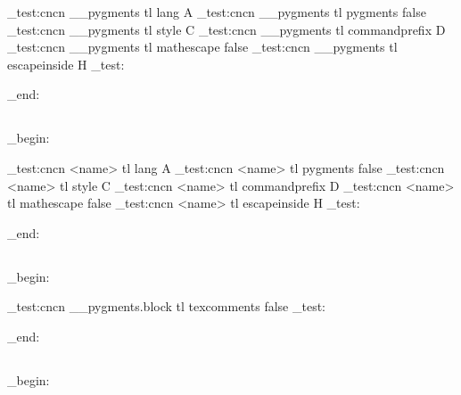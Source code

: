 
\CDR_test:cncn { __pygments } { tl } { lang } { A }
\CDR_test:cncn { __pygments } { tl } { pygments } { false }
\CDR_test:cncn { __pygments } { tl } { style } { C }
\CDR_test:cncn { __pygments } { tl } { commandprefix } { D }
\CDR_test:cncn { __pygments } { tl } { mathescape } { false }
\CDR_test:cncn { __pygments } { tl } { escapeinside } { H }
\CDR_test:

\group_end:
\ExplSyntaxOff

\subsection{}
\ExplSyntaxOn
\group_begin:
{}

\CDR_test:cncn { <name> } { tl } { lang } { A }
\CDR_test:cncn { <name> } { tl } { pygments } { false }
\CDR_test:cncn { <name> } { tl } { style } { C }
\CDR_test:cncn { <name> } { tl } { commandprefix } { D }
\CDR_test:cncn { <name> } { tl } { mathescape } { false }
\CDR_test:cncn { <name> } { tl } { escapeinside } { H }
\CDR_test:

\group_end:
\ExplSyntaxOff

\subsection{}
\ExplSyntaxOn
\group_begin:


\CDR_test:cncn { __pygments.block } { tl } { texcomments} { false }
\CDR_test:

\group_end:
\ExplSyntaxOff

\subsection{}

\ExplSyntaxOn
\group_begin:
\ExplSyntaxOff



